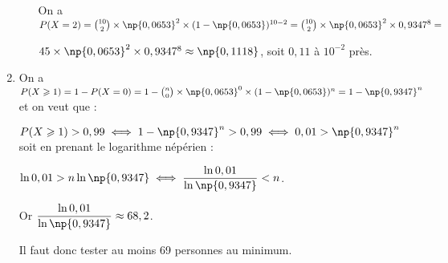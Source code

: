 \begin{enumerate}
\begin{enumerate}
On a $P(X = 2) = \binom{10}{2}\times \np{0,0653}^2 \times (1 - \np{0,0653})^{10 - 2} = \binom{10}{2}\times \np{0,0653}^2 \times 0,9347^{8} =$

$ 45 \times \np{0,0653}^2 \times 0,9347^{8} \approx \np{0,1118}$, soit $0,11$ à $10^{-2}$ près.
	\end{enumerate}
\item %
On a $P(X \geqslant 1) = 1 - P(X = 0) = 1 - \binom{n}{0} \times \np{0,0653}^0 \times (1 - \np{0,0653})^{n} = 1 - \np{0,9347}^n$ et on veut que :

$P(X \geqslant 1) > 0,99 \iff 1 - \np{0,9347}^{n} > 0,99 \iff 0,01 > \np{0,9347}^{n}$ soit en prenant le logarithme népérien :

$\ln 0,01 > n\ln \np{0,9347} \iff \dfrac{\ln 0,01}{\ln \np{0,9347}}< n$.

Or $\dfrac{\ln 0,01}{\ln \np{0,9347}} \approx 68,2$. 

Il faut donc tester au moins 69 personnes au minimum.
\end{enumerate}


